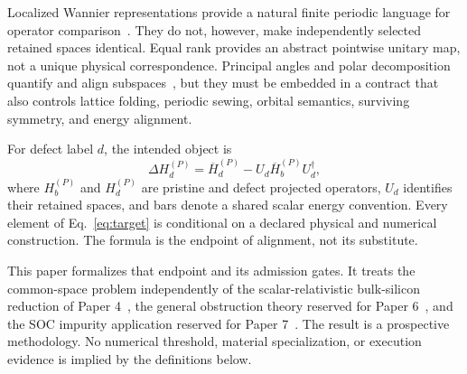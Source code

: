 \documentclass[11pt]{article}
\begin{document}
Localized Wannier representations provide a natural finite periodic language for
operator comparison~\cite{marzari2012,Mostofi2008,Pizzi2020}. They do not, however, make
independently selected retained spaces identical. Equal rank provides an abstract
pointwise unitary map, not a unique physical correspondence. Principal angles and polar
decomposition quantify and align subspaces~\cite{bjorck1973,higham1986}, but they must be
embedded in a contract that also controls lattice folding, periodic sewing, orbital
semantics, surviving symmetry, and energy alignment.

For defect label $d$, the intended object is
\begin{equation}
 \Delta H_d^{(P)}
 =\overline H_d^{(P)}-U_d\overline H_b^{(P)}U_d^\dagger,
 \label{eq:target}
\end{equation}
where $H_b^{(P)}$ and $H_d^{(P)}$ are pristine and defect projected operators, $U_d$
identifies their retained spaces, and bars denote a shared scalar energy convention.
Every element of Eq.~\eqref{eq:target} is conditional on a declared physical and
numerical construction. The formula is the endpoint of alignment, not its substitute.

This paper formalizes that endpoint and its admission gates. It treats the common-space
problem independently of the scalar-relativistic bulk-silicon reduction of Paper
4~\cite{Ragasa2026d}, the general obstruction theory reserved for Paper
6~\cite{Ragasa2026f}, and the SOC impurity application reserved for Paper
7~\cite{Ragasa2026g}. The result is a prospective methodology. No numerical threshold,
material specialization, or execution evidence is implied by the definitions below.
\end{document}
